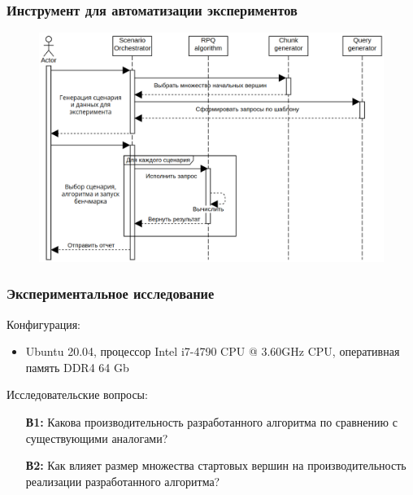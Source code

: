 \documentclass{beamer}
\begin{document}
\begin{frame}[fragile]
  \frametitle{Инструмент для автоматизации экспериментов}
  \begin{center}
    \begin{minipage}{0.9\textwidth}
      \begin{figure}[h!]
        \includegraphics[width=1\linewidth]{pictures/arch.png}
      \end{figure}
    \end{minipage}
  \end{center}
\end{frame}

\begin{frame}[fragile]
  \frametitle{Экспериментальное исследование}
  Конфигурация:
  \begin{itemize}
    \item Ubuntu 20.04, процессор Intel i7-4790 CPU @ 3.60GHz CPU, оперативная память DDR4 64 Gb
  \end{itemize}
  \vspace{10pt}
  Исследовательские вопросы:
  {
  \begin{itemize}
    \item[\textbf{В1:}] Какова производительность разработанного алгоритма по сравнению с существующими аналогами?

    \item[\textbf{В2:}] Как влияет размер множества стартовых вершин на производительность реализации разработанного алгоритма?
  \end{itemize}
  }
\end{frame}
\end{document}
